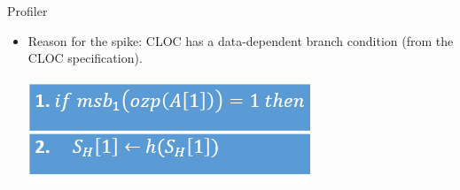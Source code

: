 \documentclass[xcolor=pdftex,dvipsnames,table,final]{beamer}
\begin{document}
\begin{frame}[fragile]{}
\begin{columns}[t]
\begin{column}{.31\linewidth}
\begin{block}{Profiler}
\begin{itemize}
\begin{itemize}
\begin{center}
          \end{center}
          \item Reason for the spike: CLOC has a data-dependent branch condition (from the CLOC specification).
          \newline
          \begin{center}
          \includegraphics[scale=1.2]{../figures/cloc_aes_branch.png}
           \end{center}

         \end{itemize}

         \end{itemize}
       
       
          
    
         
      \end{block}
%          
%          
   \end{column}
\end{columns}

\end{frame}
\end{document}
